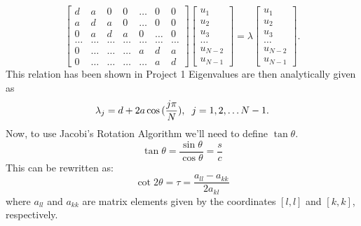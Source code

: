 \documentclass{article}
\begin{document}
\begin{equation}
    \begin{bmatrix} d& a & 0   & 0    & \dots  &0     & 0 \\
                                a & d & a & 0    & \dots  &0     &0 \\
                                0   & a & d & a  &0       &\dots & 0\\
                                \dots  & \dots & \dots & \dots  &\dots      &\dots & \dots\\
                                0   & \dots & \dots & \dots  &a  &d & a\\
                                0   & \dots & \dots & \dots  &\dots       &a & d\end{bmatrix} 
                                 \begin{bmatrix} u_1 \\ u_2 \\ u_3 \\ \dots \\ u_{N-2} \\ u_{N-1}\end{bmatrix} = \lambda \begin{bmatrix} u_1 \\ u_2 \\ u_3 \\ \dots \\ u_{N-2} \\ u_{N-1}\end{bmatrix} . 
\label{eq:matrixse} 
\end{equation}
This relation has been shown in Project 1 \cite{proj1}
Eigenvalues are then analytically given as
\begin{equation}
    \lambda_j = d+2a\cos{(\frac{j\pi}{N})}, \hspace{0.2cm} j=1,2,\dots N-1.
\end{equation}
\newline
Now, to use Jacobi's Rotation Algorithm we'll need to define $\tan \theta$.
\begin{equation*}
    \tan \theta = \frac{\sin \theta}{\cos \theta} = \frac{s}{c}
\end{equation*}
\newpage
This can be rewritten as:
\begin{equation*}
    \cot 2\theta=\tau = \frac{a_{ll}-a_{kk}}{2a_{kl}}
\end{equation*}
\newline
where $a_{ll}$ and $a_{kk}$ are matrix elements given by the coordinates $[l,l]$ and $[k,k]$, respectively. \newline
\end{document}

